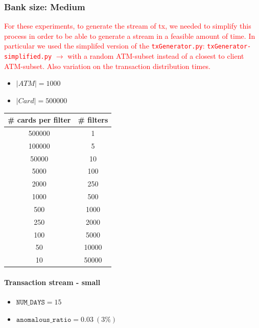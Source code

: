 \documentclass[12pt,a4paper]{article}
\begin{document}
\subsubsection{Bank size: Medium}

\textcolor{red}{For these experiments, to generate the stream of tx, we needed to simplify this process in order to be able to generate a stream in a feasible amount of time. In particular we used the simplifed version of the \texttt{txGenerator.py}: \texttt{txGenerator-simplified.py} $\rightarrow$ with a random ATM-subset instead of a closest to client ATM-subset. Also variation on the transaction distribution times.}


\begin{itemize}
  \item $|ATM| = 1000$
  \item $|Card| = 500000$
\end{itemize}

\begin{table}[H]
  \renewcommand{\arraystretch}{1.5} %
  \centering
  \begin{tabular}{|c|c|}
  \hline
  \# cards per filter & \# filters \\ \hline
  500000   &   1     \\ \hline
  100000   &   5     \\ \hline
  50000 &   10     \\ \hline
  5000  &   100     \\ \hline
  2000 &   250    \\ \hline
  1000  &   500    \\ \hline
  500  &   1000    \\ \hline
  250  &   2000    \\ \hline
  100  &   5000    \\ \hline
  50  &   10000    \\ \hline
  10  &   50000    \\ \hline
  \end{tabular}
\end{table}

\paragraph{Transaction stream - small\\}


\begin{itemize}
  \item $\texttt{NUM\_DAYS} = 15$
  \item $\texttt{anomalous\_ratio} = 0.03\ (3\%)$ 
\end{itemize}
\end{document}
